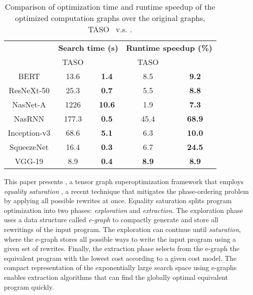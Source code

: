\begin{table}[]
    \centering
    \begin{tabular}{ccc|cc}
    \hline
    & \multicolumn{2}{c|}{\bf Search time (s)} & \multicolumn{2}{c}{\bf Runtime speedup (\%)} \\
    & TASO & \ourname{} & TASO & \ourname{} \\
    \hline
    BERT & 13.6 & \textbf{1.4} & 8.5 & \textbf{9.2} \\
    ResNeXt-50 & 25.3 & \textbf{0.7} & 5.5 & \textbf{8.8} \\
    NasNet-A & 1226 & \textbf{10.6} & 1.9 & \textbf{7.3} \\
    NasRNN & 177.3 & \textbf{0.5} & 45.4 & \textbf{68.9} \\
    Inception-v3 & 68.6 & \textbf{5.1} & 6.3 & \textbf{10.0} \\
    SqueezeNet & 16.4 & \textbf{0.3} & 6.7 & \textbf{24.5} \\
    VGG-19 & 8.9 & \textbf{0.4} & \textbf{8.9} & \textbf{8.9} \\
    \hline
    \end{tabular}
    \caption{Comparison of optimization time and runtime speedup of the optimized computation graphs over the original graphs, TASO~\cite{taso} v.s. \ourname{}.}
    \label{table:ngraph}
\end{table}


This paper presents \ourname{}, a tensor graph superoptimization framework that employs \emph{equality saturation} \cite{eqsat, eqsat-llvm, egg},
a recent technique that mitigates the phase-ordering problem by
applying all possible rewrites at once.  %
Equality saturation splits program optimization into two phases: {\em exploration} and {\em extraction}.
The exploration phase uses a data structure called \emph{e-graph} to compactly generate and store all rewritings of the input program.
The exploration can continue until \emph{saturation},
where the e-graph stores all possible ways to write the input program using a given set of rewrites.
Finally, the extraction phase selects from the e-graph the equivalent program with the lowest cost according to a given cost model. The compact representation of the exponentially large search space using e-graphs enables extraction algorithms that can find the globally optimal equivalent program quickly.

